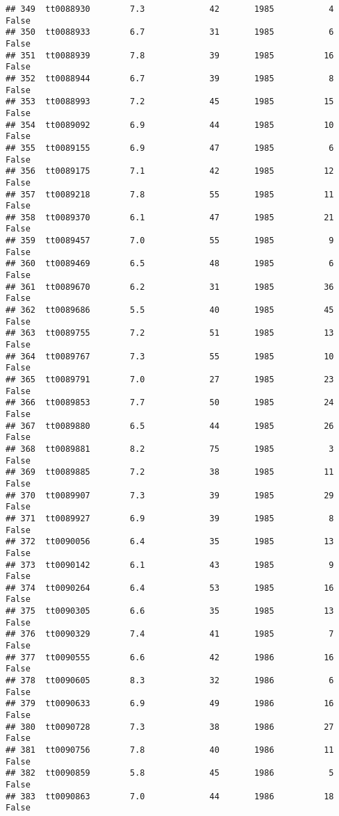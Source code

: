 \documentclass[
]{article}
\begin{document}
\begin{verbatim}
## 349  tt0088930        7.3             42       1985           4   False
## 350  tt0088933        6.7             31       1985           6   False
## 351  tt0088939        7.8             39       1985          16   False
## 352  tt0088944        6.7             39       1985           8   False
## 353  tt0088993        7.2             45       1985          15   False
## 354  tt0089092        6.9             44       1985          10   False
## 355  tt0089155        6.9             47       1985           6   False
## 356  tt0089175        7.1             42       1985          12   False
## 357  tt0089218        7.8             55       1985          11   False
## 358  tt0089370        6.1             47       1985          21   False
## 359  tt0089457        7.0             55       1985           9   False
## 360  tt0089469        6.5             48       1985           6   False
## 361  tt0089670        6.2             31       1985          36   False
## 362  tt0089686        5.5             40       1985          45   False
## 363  tt0089755        7.2             51       1985          13   False
## 364  tt0089767        7.3             55       1985          10   False
## 365  tt0089791        7.0             27       1985          23   False
## 366  tt0089853        7.7             50       1985          24   False
## 367  tt0089880        6.5             44       1985          26   False
## 368  tt0089881        8.2             75       1985           3   False
## 369  tt0089885        7.2             38       1985          11   False
## 370  tt0089907        7.3             39       1985          29   False
## 371  tt0089927        6.9             39       1985           8   False
## 372  tt0090056        6.4             35       1985          13   False
## 373  tt0090142        6.1             43       1985           9   False
## 374  tt0090264        6.4             53       1985          16   False
## 375  tt0090305        6.6             35       1985          13   False
## 376  tt0090329        7.4             41       1985           7   False
## 377  tt0090555        6.6             42       1986          16   False
## 378  tt0090605        8.3             32       1986           6   False
## 379  tt0090633        6.9             49       1986          16   False
## 380  tt0090728        7.3             38       1986          27   False
## 381  tt0090756        7.8             40       1986          11   False
## 382  tt0090859        5.8             45       1986           5   False
## 383  tt0090863        7.0             44       1986          18   False

\end{verbatim}
\end{document}
